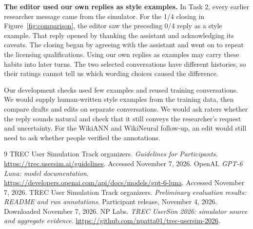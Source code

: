 \documentclass[11pt,letterpaper]{article}
\begin{document}
\textbf{The editor used our own replies as style examples.} In Task 2, every earlier researcher message came from the simulator. For the 1/4 closing in Figure~\ref{fig:comparison}, the editor saw the preceding 0/4 reply as a style example. That reply opened by thanking the assistant and acknowledging its caveats. The closing began by agreeing with the assistant and went on to repeat the licensing qualifications. Using our own replies as examples may carry these habits into later turns. The two selected conversations have different histories, so their ratings cannot tell us which wording choices caused the difference.

Our development checks used few examples and reused training conversations. We would supply human-written style examples from the training data, then compare drafts and edits on separate conversations. We would ask raters whether the reply sounds natural and check that it still conveys the researcher's request and uncertainty. For the WikiANN and WikiNeural follow-up, an edit would still need to ask whether people verified the annotations.

\begin{thebibliography}{9}\small
{} TREC User Simulation Track organizers. \emph{Guidelines for Participants}. \url{https://trec.usersim.ai/guidelines}. Accessed November 7, 2026.
 OpenAI. \emph{GPT-6 Luna: model documentation}. \url{https://developers.openai.com/api/docs/models/gpt-6-luna}. Accessed November 7, 2026.
 TREC User Simulation Track organizers. \emph{Preliminary evaluation results: README and run annotations}. Participant release, November 4, 2026. Downloaded November 7, 2026.
 NP Labs. \emph{TREC UserSim 2026: simulator source and aggregate evidence}. \url{https://github.com/npatta01/trec-usersim-2026}.
\end{thebibliography}
\end{document}
